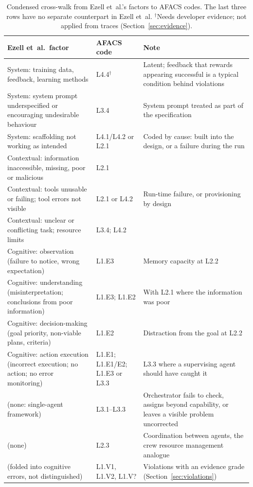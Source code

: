 \documentclass[11pt]{article}
\begin{document}
\begin{table}[tbp]
\centering
\caption{Condensed cross-walk from Ezell et~al.'s factors to AFACS codes. The
last three rows have no separate counterpart in Ezell et~al. $^{\dagger}$Needs
developer evidence; not applied from traces (Section~\ref{sec:evidence}).}
\label{tab:crosswalk}
\small
\begin{tabular}{@{}L{5.2cm}L{3.2cm}L{5.6cm}@{}}
\toprule
Ezell et~al.\ factor & AFACS code & Note\\
\midrule
System: training data, feedback, learning methods & L4.4$^{\dagger}$ & Latent; feedback that rewards appearing successful is a typical condition behind violations\\
System: system prompt underspecified or encouraging undesirable behaviour & L3.4 & System prompt treated as part of the specification\\
System: scaffolding not working as intended & L4.1/L4.2 or L2.1 & Coded by cause: built into the design, or a failure during the run\\
Contextual: information inaccessible, missing, poor or malicious & L2.1 & \\
Contextual: tools unusable or failing; tool errors not visible & L2.1 or L4.2 & Run-time failure, or provisioning by design\\
Contextual: unclear or conflicting task; resource limits & L3.4; L4.2 & \\
Cognitive: observation (failure to notice, wrong expectation) & L1.E3 & Memory capacity at L2.2\\
Cognitive: understanding (misinterpretation; conclusions from poor information) & L1.E3; L1.E2 & With L2.1 where the information was poor\\
Cognitive: decision-making (goal priority, non-viable plans, criteria) & L1.E2 & Distraction from the goal at L2.2\\
Cognitive: action execution (incorrect execution; no action; no error monitoring) & L1.E1; L1.E1/E2; L1.E3 or L3.3 & L3.3 where a supervising agent should have caught it\\
\midrule
(none: single-agent framework) & L3.1--L3.3 & Orchestrator fails to check, assigns beyond capability, or leaves a visible problem uncorrected\\
(none) & L2.3 & Coordination between agents, the crew resource management analogue\\
(folded into cognitive errors, not distinguished) & L1.V1, L1.V2, L1.V? & Violations with an evidence grade (Section~\ref{sec:violations})\\
\bottomrule
\end{tabular}
\end{table}
\end{document}
